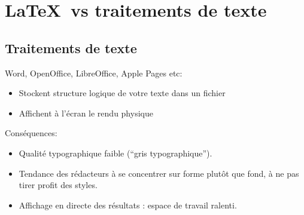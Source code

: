 \section{\LaTeX\ vs traitements de texte}

\subsection{Traitements de texte}
\begin{frame}

Word, OpenOffice, LibreOffice, Apple Pages etc:

\begin{itemize}
  \item Stockent structure logique de votre texte dans un fichier
  \item Affichent à l'écran le rendu physique
\end{itemize}

\end{frame}

\begin{frame}
Conséquences:
\begin{itemize}
  \item Qualité typographique faible (\enquote{gris typographique}).
  \item Tendance des rédacteurs à se concentrer sur forme plutôt que fond, à ne pas tirer profit des styles.
  \item Affichage en directe des résultats : espace de travail ralenti.

\end{itemize}
\end{frame}

